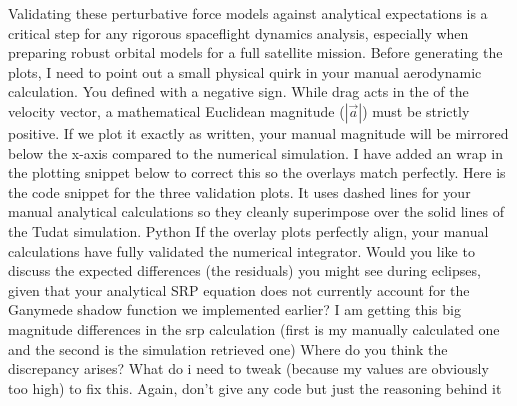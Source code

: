 {}\markdownRendererSectionBegin
{}\markdownRendererInterblockSeparator
{}Validating these perturbative force models against analytical expectations is a critical step for any rigorous spaceflight dynamics analysis, especially when preparing robust orbital models for a full satellite mission.\markdownRendererInterblockSeparator
{}Before generating the plots, I need to point out a small physical quirk in your manual aerodynamic calculation. You defined  with a negative sign. While drag acts in the  of the velocity vector, a mathematical Euclidean magnitude ($| \vec{a} |$) must be strictly positive. If we plot it exactly as written, your manual magnitude will be mirrored below the x-axis compared to the numerical simulation. I have added an  wrap in the plotting snippet below to correct this so the overlays match perfectly.\markdownRendererInterblockSeparator
{}Here is the code snippet for the three validation plots. It uses dashed lines for your manual analytical calculations so they cleanly superimpose over the solid lines of the Tudat simulation.\markdownRendererInterblockSeparator
{}Python\markdownRendererInterblockSeparator
{}\markdownRendererInterblockSeparator
{}If the overlay plots perfectly align, your manual calculations have fully validated the numerical integrator.\markdownRendererInterblockSeparator
{}Would you like to discuss the expected differences (the residuals) you might see during eclipses, given that your analytical SRP equation does not currently account for the Ganymede shadow function we implemented earlier?\markdownRendererInterblockSeparator
{}\markdownRendererThematicBreak{}\markdownRendererInterblockSeparator
{}
\markdownRendererSectionEnd \markdownRendererSectionBegin
{}\markdownRendererInterblockSeparator
{}I am getting this big magnitude differences in the srp calculation (first is my manually calculated one and the second is the simulation retrieved one) Where do you think the discrepancy arises? What do i need to tweak (because my values are obviously too high) to fix this. Again, don't give any code but just the reasoning behind it\markdownRendererInterblockSeparator
{}
\markdownRendererSectionEnd \markdownRendererSectionBegin
{}\markdownRendererInterblockSeparator
